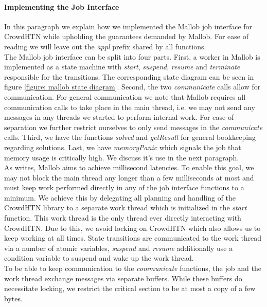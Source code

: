 \paragraph{Implementing the Job Interface}
In this paragraph we explain how we implemented the Mallob job interface for CrowdHTN while upholding the guarantees demanded by Mallob. For ease of reading we will leave out the \textit{appl} prefix shared by all functions. \\
The Mallob job interface can be split into four parts. First, a worker in Mallob is implemented as a state machine with \textit{start}, \textit{suspend}, \textit{resume} and \textit{terminate} responsible for the transitions. The corresponding state diagram can be seen in figure \ref{figure: mallob state diagram}. Second, the two \textit{communicate} calls allow for communication. For general communication we note that Mallob requires all communication calls to take place in the main thread, i.e. we may not send any messages in any threads we started to perform internal work. For ease of separation we further restrict ourselves to only send messages in the \textit{communicate} calls. Third, we have the functions \textit{solved} and \textit{getResult} for general bookkeeping regarding solutions. Last, we have \textit{memoryPanic} which signals the job that memory usage is critically high. We discuss it's use in the next paragraph. \\
As \cite{schreiber2021scalable} writes, Mallob aims to achieve millisecond latencies. To enable this goal, we may not block the main thread any longer than a few milliseconds at most and must keep work performed directly in any of the job interface functions to a minimum. We achieve this by delegating all planning and handling of the CrowdHTN library to a separate work thread which is initialized in the \textit{start} function. This work thread is the only thread ever directly interacting with CrowdHTN. Due to this, we avoid locking on CrowdHTN which also allows us to keep working at all times. State transitions are communicated to the work thread via a number of atomic variables, \textit{suspend} and \textit{resume} additionally use a condition variable to suspend and wake up the work thread. \\
To be able to keep communication to the \textit{communicate} functions, the job and the work thread exchange messages via separate buffers. While these buffers do necessitate locking, we restrict the critical section to be at most a copy of a few bytes. \\

